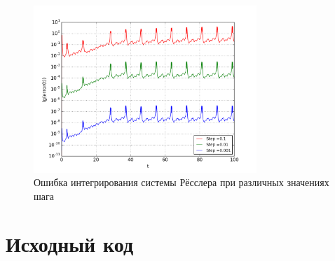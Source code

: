 \documentclass[a4paper]{article}
\begin{document}
\begin{figure}[H]
	\center
	\includegraphics[width=0.75\textwidth]{../pictures/lab3_rossler_system.png}
	\caption{Ошибка интегрирования системы Рёсслера при различных значениях шага}
	\label{fig:rossler_system}
\end{figure}


\section{Исходный код}

\end{document}

